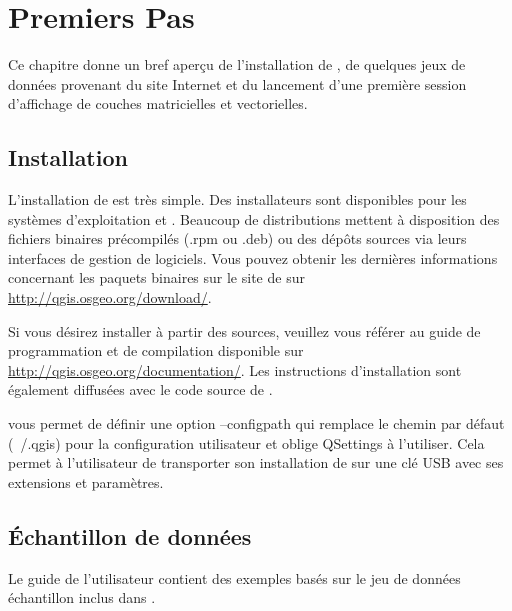 
\chapter{Premiers Pas}\label{label_getstarted}


Ce chapitre donne un bref aperçu de l'installation de \qg, de quelques jeux de données provenant du site Internet et du lancement d'une première session d'affichage de couches matricielles et vectorielles.

\section{Installation}\label{label_installation}

L'installation de \qg est très simple. Des installateurs sont disponibles pour les systèmes d'exploitation \mswin et \mac. Beaucoup de distributions \tux mettent à disposition des fichiers binaires précompilés (.rpm ou .deb) ou des dépôts sources via leurs interfaces de gestion de logiciels. Vous pouvez obtenir les dernières informations concernant les paquets binaires sur le site de \qg sur \url{http://qgis.osgeo.org/download/}.


Si vous désirez installer \qg à  partir des sources, veuillez vous référer au guide de programmation et de compilation disponible sur \url{http://qgis.osgeo.org/documentation/}.
Les instructions d'installation sont également diffusées avec le code source de \qg.


\qg vous permet de définir une option --configpath qui remplace le chemin par défaut (~/.qgis) pour la configuration utilisateur et oblige QSettings à l'utiliser. Cela permet à l'utilisateur de transporter son installation de \qg sur une clé USB avec ses extensions et paramètres.

\section{Échantillon de données}\label{label_sampledata}

Le guide de l'utilisateur contient des exemples basés sur le jeu de données échantillon inclus dans \qg.

